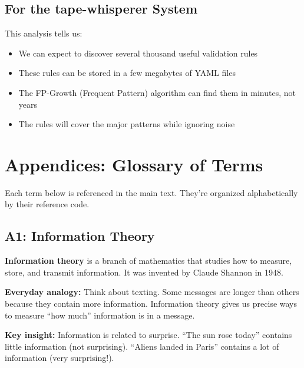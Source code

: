 \documentclass[11pt,a4paper]{article}
\begin{document}
\subsection{For the tape-whisperer System}

This analysis tells us:
\begin{itemize}
    \item We can expect to discover several thousand useful validation rules
    \item These rules can be stored in a few megabytes of YAML files
    \item The FP-Growth (Frequent Pattern) algorithm can find them in minutes, not years
    \item The rules will cover the major patterns while ignoring noise
\end{itemize}

\newpage
\appendix
\section*{Appendices: Glossary of Terms}

Each term below is referenced in the main text. They're organized alphabetically by their reference code.

\subsection*{A1: Information Theory}
\label{A1}

\textbf{Information theory} is a branch of mathematics that studies how to measure, store, and transmit information. It was invented by Claude Shannon in 1948.

\textbf{Everyday analogy:} Think about texting. Some messages are longer than others because they contain more information. Information theory gives us precise ways to measure ``how much'' information is in a message.

\textbf{Key insight:} Information is related to surprise. ``The sun rose today'' contains little information (not surprising). ``Aliens landed in Paris'' contains a lot of information (very surprising!).

\end{document}
